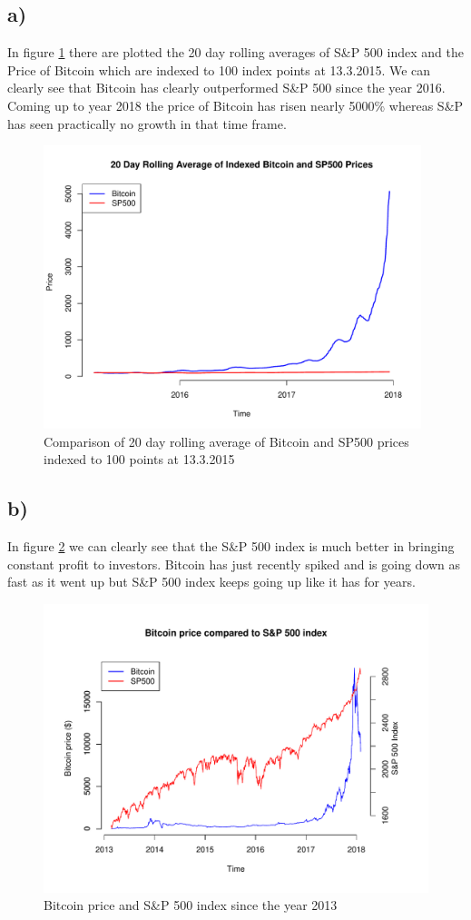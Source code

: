 \documentclass[a4paper,10pt]{article}
\begin{document}
\subsection*{a)}
In figure \ref{Bitcoinbetter} there are plotted the 20 day rolling averages of S\&P 500 index and the Price of Bitcoin which are indexed to 100 index points at 13.3.2015. We can clearly see that Bitcoin has clearly outperformed S\&P 500 since the year 2016. Coming up to year 2018 the price of Bitcoin has risen nearly 5000\% whereas S\&P has seen practically no growth in that time frame. 
\begin{figure}
\centering
\includegraphics[width = 11cm]{bitcoin_better}
\caption{Comparison of 20 day rolling average of Bitcoin and SP500 prices indexed to 100 points at 13.3.2015}
\label{Bitcoinbetter}
\end{figure}

\subsection*{b)}

In figure \ref{spbetter} we can clearly see that the S\&P 500 index is much better in bringing constant profit to investors. Bitcoin has just recently spiked and is going down as fast as it went up but S\&P 500 index keeps going up like it has for years. 

\begin{figure}
\centering
\includegraphics[width = 13cm]{sp_better}
\caption{Bitcoin price and S\&P 500 index since the year 2013}
\label{spbetter}
\end{figure}
\end{document}
